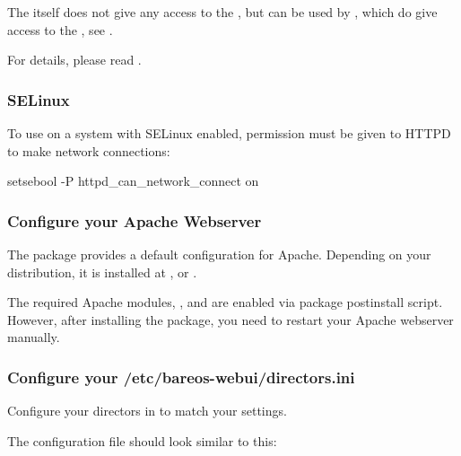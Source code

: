 The  itself does not give any access to the \bareosDir,
but can be used by , which do give access to the \bareosDir, see .

For details, please read .

\subsubsection{SELinux}
\label{sec:webui-selinux}

To use \bareosDir on a system with SELinux enabled,
permission must be given to HTTPD to make network connections:
\begin{commands}{}
setsebool -P httpd_can_network_connect on
\end{commands}


\subsubsection{Configure your Apache Webserver}
\label{sec:webui-apache}

The package  provides a default configuration for Apache.
Depending on your distribution, it is installed at ,  or .

The required Apache modules, ,  and  are enabled via package postinstall script.
However, after installing the  package, you need to restart your Apache webserver manually.

\subsubsection{Configure your /etc/bareos-webui/directors.ini}

Configure your directors in  to match your settings.

The configuration file  should look similar to this:

